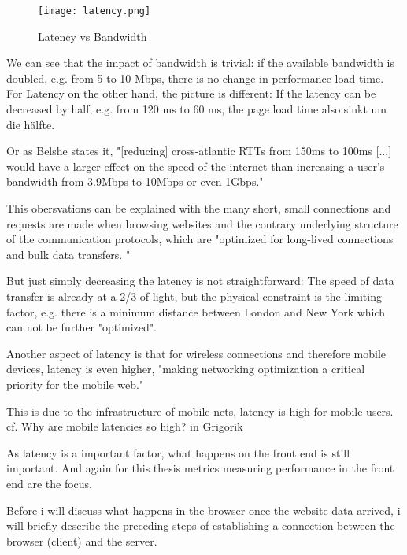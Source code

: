 \begin{figure}[h!]
\begin{center}
\texttt{[image: latency.png]}
\caption{Latency vs Bandwidth}
\label{img:latency}
\end{center}
\end{figure}


We can see that the impact of bandwidth is trivial: if the available bandwidth is doubled, e.g. from 5 to 10 Mbps, there is no change in performance load time.
For Latency on the other hand, the picture is different: If the latency can be decreased by half, e.g. from 120 ms to 60 ms, the page load time also sinkt um die hälfte.

Or as Belshe states it, "[reducing] cross-atlantic RTTs from 150ms to 100ms [...] would have a larger effect on the speed of the internet than increasing a user's bandwidth from 3.9Mbps to 10Mbps or even 1Gbps." %

This obersvations can be explained with the many short, small connections and requests are made when browsing websites and the contrary underlying structure of the communication protocols, which are "optimized for long-lived connections and bulk data transfers. " %

But just simply decreasing the latency is not straightforward: The speed of data transfer is already at a 2/3 of light, but the physical constraint is the limiting factor, e.g. there is a minimum distance between London and New York which can not be further "optimized". %



Another aspect of latency is that for wireless connections and therefore mobile devices, latency is even higher, "making networking optimization a critical priority for the mobile web." %

This is due to the infrastructure of mobile nets, latency is high for mobile users. cf.  Why are mobile latencies so high? in Grigorik %


As latency is a important factor, what happens on the front end is still important.
And again for this thesis metrics measuring performance in the front end are the focus.

Before i will discuss what happens in the browser once the website data arrived, i will briefly describe the preceding steps of establishing a connection between the browser (client) and the server.


